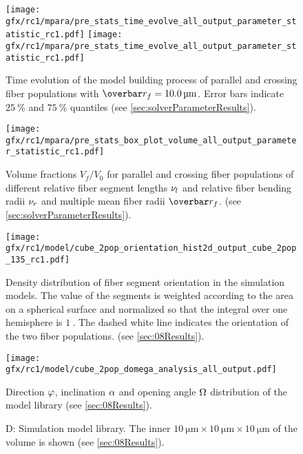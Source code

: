 %
\begin{sidewaysfigure}[!p]
    \centering
    \texttt{[image: gfx/rc1/mpara/pre\_stats\_time\_evolve\_all\_output\_parameter\_statistic\_rc1.pdf]}
    \texttt{[image: gfx/rc1/mpara/pre\_stats\_time\_evolve\_all\_output\_parameter\_statistic\_rc1.pdf]}
    \label{app:pste5}
    \caption[]{Time evolution of the model building process of parallel and crossing fiber populations with $\fiberRadiusMean=\SI{10.0}{\micro\meter}$. Error bars indicate $\SI{25}{\percent}$ and $\SI{75}{\percent}$ quantiles (see \cref{sec:solverParameterResults}).}
\end{sidewaysfigure}
% 
\begin{figure}[!p]
    \centering
    \texttt{[image: gfx/rc1/mpara/pre\_stats\_box\_plot\_volume\_all\_output\_parameter\_statistic\_rc1.pdf]}
    \caption[]{Volume fractions $V_f/V_0$ for parallel \pfbs{} and crossing \cfbs{} fiber populations of different relative fiber segment lengths $\textnormal{$\nu_{l}$}$ and relative fiber bending radii $\textnormal{$\nu_{r}$}$ and multiple mean fiber radii $\fiberRadiusMean$. (see \cref{sec:solverParameterResults}).}
    \label{app:appModelVolumeBoxPlot}
\end{figure}
%
\begin{figure}[!p]
    \centering
    \texttt{[image: gfx/rc1/model/cube\_2pop\_orientation\_hist2d\_output\_cube\_2pop\_135\_rc1.pdf]}
    \caption[]{Density distribution of fiber segment orientation in the simulation models.
    The value of the segments is weighted according to the area on a spherical surface and normalized so that the integral over one hemisphere is $\SI{1}{}$.
    The dashed white line indicates the orientation of the two fiber populations. (see \cref{sec:08Results}).}
    \label{app:modelOrientation}
\end{figure}
%
\begin{figure}[!p]
    \centering
    \texttt{[image: gfx/rc1/model/cube\_2pop\_domega\_analysis\_all\_output.pdf]}
    \caption[]{Direction $\textnormal{$\varphi$}$, inclination $\textnormal{$\alpha$}$ and opening angle $\textnormal{$\Omega$}$ distribution of the model library (see \cref{sec:08Results}).}
    \label{app:modelAngleBoxPlot}
\end{figure}
%
\begin{figure}[!p]
    \centering
    \caption[]{D: Simulation model library. The inner $\SI{10}{\micro\meter} \times \SI{10}{\micro\meter} \times \SI{10}{\micro\meter}$ of the volume is shown (see \cref{sec:08Results}).}
    \label{app:modelImages}
\end{figure}
